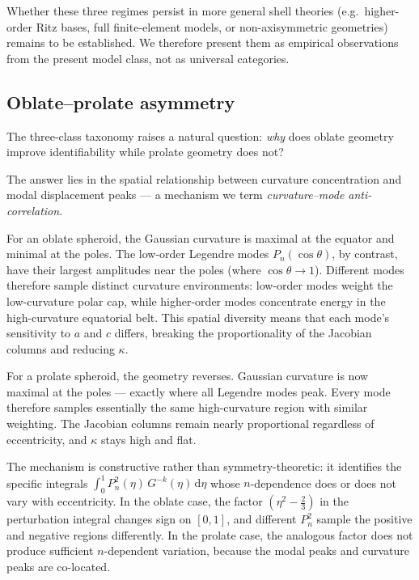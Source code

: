 Whether these three regimes persist in more general shell theories (e.g.\
higher-order Ritz bases, full finite-element models, or non-axisymmetric
geometries) remains to be established.  We therefore present them as
empirical observations from the present model class, not as universal
categories.

\subsection{Oblate--prolate asymmetry}\label{sec:oblate_prolate}

The three-class taxonomy raises a natural question: \emph{why} does oblate
geometry improve identifiability while prolate geometry does not?

The answer lies in the spatial relationship between curvature concentration
and modal displacement peaks --- a mechanism we term
\emph{curvature--mode anti-correlation}.

For an oblate spheroid, the Gaussian curvature is maximal at the equator and
minimal at the poles.  The low-order Legendre modes $P_n(\cos\theta)$, by
contrast, have their largest amplitudes near the poles (where
$\cos\theta \to 1$).  Different modes therefore sample distinct curvature
environments: low-order modes weight the low-curvature polar cap, while
higher-order modes concentrate energy in the high-curvature equatorial belt.
This spatial diversity means that each mode's sensitivity to $a$ and $c$
differs, breaking the proportionality of the Jacobian columns and reducing
$\kappa$.

For a prolate spheroid, the geometry reverses.  Gaussian curvature is now
maximal at the poles --- exactly where all Legendre modes peak.  Every mode
therefore samples essentially the same high-curvature region with similar
weighting.  The Jacobian columns remain nearly proportional regardless of
eccentricity, and $\kappa$ stays high and flat.

The mechanism is constructive rather than symmetry-theoretic: it identifies
the specific integrals
$\int_0^1 P_n^2(\eta)\,G^{-k}(\eta)\,\mathrm{d}\eta$ whose $n$-dependence
does or does not vary with eccentricity.  In the oblate case, the factor
$(\eta^2 - \tfrac{2}{3})$ in the perturbation
integral changes sign on $[0,1]$, and different
$P_n^2$ sample the positive and negative regions differently.  In the
prolate case, the analogous factor does not produce sufficient
$n$-dependent variation, because the modal peaks and curvature peaks are
co-located.

